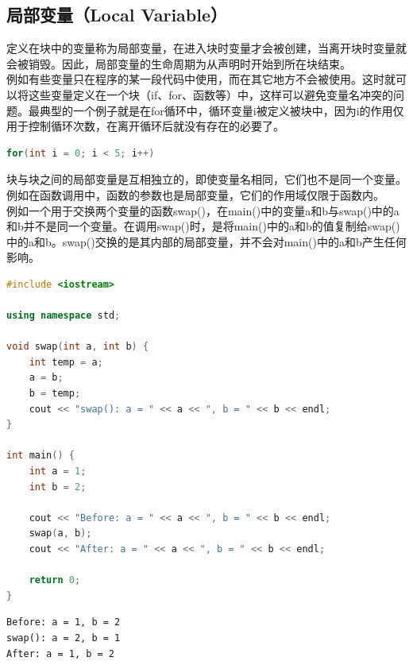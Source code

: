 \subsection{局部变量（Local Variable）}

定义在块中的变量称为局部变量，在进入块时变量才会被创建，当离开块时变量就会被销毁。因此，局部变量的生命周期为从声明时开始到所在块结束。\\

例如有些变量只在程序的某一段代码中使用，而在其它地方不会被使用。这时就可以将这些变量定义在一个块（if、for、函数等）中，这样可以避免变量名冲突的问题。最典型的一个例子就是在for循环中，循环变量i被定义被块中，因为i的作用仅用于控制循环次数，在离开循环后就没有存在的必要了。

\vspace{-0.5cm}

\begin{lstlisting}[language=C]
for(int i = 0; i < 5; i++)
\end{lstlisting}

块与块之间的局部变量是互相独立的，即使变量名相同，它们也不是同一个变量。\\

例如在函数调用中，函数的参数也是局部变量，它们的作用域仅限于函数内。\\

例如一个用于交换两个变量的函数swap()，在main()中的变量a和b与swap()中的a和b并不是同一个变量。在调用swap()时，是将main()中的a和b的值复制给swap()中的a和b。swap()交换的是其内部的局部变量，并不会对main()中的a和b产生任何影响。\\


\begin{lstlisting}[language=C++]
#include <iostream>

using namespace std;

void swap(int a, int b) {
	int temp = a;
	a = b;
	b = temp;
	cout << "swap(): a = " << a << ", b = " << b << endl;
}

int main() {
	int a = 1;
	int b = 2;

	cout << "Before: a = " << a << ", b = " << b << endl;
	swap(a, b);
	cout << "After: a = " << a << ", b = " << b << endl;

	return 0;
}
\end{lstlisting}

\begin{tcolorbox}
	\begin{verbatim}
Before: a = 1, b = 2
swap(): a = 2, b = 1
After: a = 1, b = 2
	\end{verbatim}
\end{tcolorbox}

